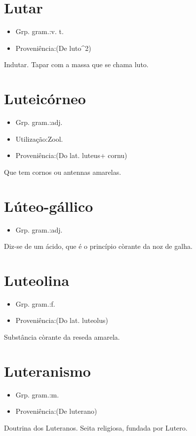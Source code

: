 \section{Lutar}
\begin{itemize}
\item {Grp. gram.:v. t.}
\end{itemize}
\begin{itemize}
\item {Proveniência:(De \textunderscore luto\textunderscore ^2)}
\end{itemize}
Indutar.
Tapar com a massa que se chama luto.
\section{Luteicórneo}
\begin{itemize}
\item {Grp. gram.:adj.}
\end{itemize}
\begin{itemize}
\item {Utilização:Zool.}
\end{itemize}
\begin{itemize}
\item {Proveniência:(Do lat. \textunderscore luteus\textunderscore  + \textunderscore cornu\textunderscore )}
\end{itemize}
Que tem cornos ou antennas amarelas.
\section{Lúteo-gállico}
\begin{itemize}
\item {Grp. gram.:adj.}
\end{itemize}
Diz-se de um ácido, que é o princípio còrante da noz de galha.
\section{Luteolina}
\begin{itemize}
\item {Grp. gram.:f.}
\end{itemize}
\begin{itemize}
\item {Proveniência:(Do lat. \textunderscore luteolus\textunderscore )}
\end{itemize}
Substância còrante da reseda amarela.
\section{Luteranismo}
\begin{itemize}
\item {Grp. gram.:m.}
\end{itemize}
\begin{itemize}
\item {Proveniência:(De \textunderscore luterano\textunderscore )}
\end{itemize}
Doutrina dos Luteranos.
Seita religiosa, fundada por Lutero.
